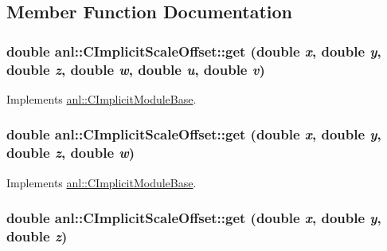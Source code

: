 \subsection{Member Function Documentation}
\hypertarget{classanl_1_1CImplicitScaleOffset_a5e048c2abd25d3b6ba95838fa1c7712d}{
\subsubsection[{get}]{\setlength{\rightskip}{0pt plus 5cm}double anl::CImplicitScaleOffset::get (double {\em x}, \/  double {\em y}, \/  double {\em z}, \/  double {\em w}, \/  double {\em u}, \/  double {\em v})}}
\label{classanl_1_1CImplicitScaleOffset_a5e048c2abd25d3b6ba95838fa1c7712d}


Implements \hyperlink{classanl_1_1CImplicitModuleBase_aa40b7d54572197612a4fea44b63447eb}{anl::CImplicitModuleBase}.\hypertarget{classanl_1_1CImplicitScaleOffset_a8ac84534b65230172a9f2e61fbfaa0ae}{
\subsubsection[{get}]{\setlength{\rightskip}{0pt plus 5cm}double anl::CImplicitScaleOffset::get (double {\em x}, \/  double {\em y}, \/  double {\em z}, \/  double {\em w})}}
\label{classanl_1_1CImplicitScaleOffset_a8ac84534b65230172a9f2e61fbfaa0ae}


Implements \hyperlink{classanl_1_1CImplicitModuleBase_a3cf520bdab59631864253c03b4e1723f}{anl::CImplicitModuleBase}.\hypertarget{classanl_1_1CImplicitScaleOffset_a1dbdceab30f5303f7fda0eb9a5ca1cdd}{
\subsubsection[{get}]{\setlength{\rightskip}{0pt plus 5cm}double anl::CImplicitScaleOffset::get (double {\em x}, \/  double {\em y}, \/  double {\em z})}}
\label{classanl_1_1CImplicitScaleOffset_a1dbdceab30f5303f7fda0eb9a5ca1cdd}



